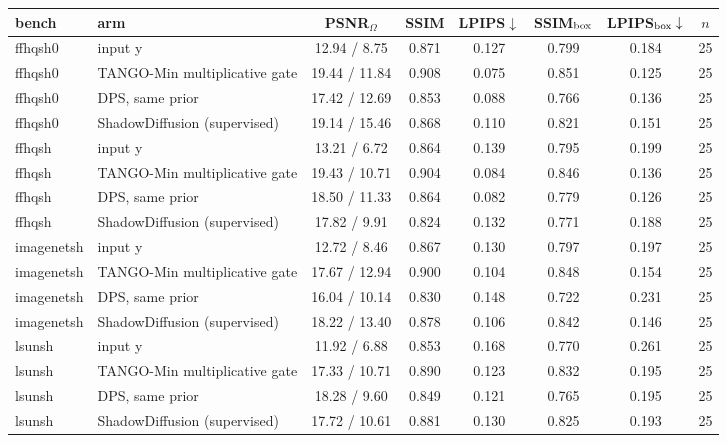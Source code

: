 \begin{tabular}{llcccccc}
\toprule
bench & arm & PSNR$_\Omega$ & SSIM & LPIPS$\downarrow$ & SSIM$_{\rm box}$ & LPIPS$_{\rm box}\downarrow$ & $n$\\
\midrule
ffhqsh0 & input y & 12.94 / 8.75 & 0.871 & 0.127 & 0.799 & 0.184 & 25\\
ffhqsh0 & TANGO-Min multiplicative gate & 19.44 / 11.84 & 0.908 & 0.075 & 0.851 & 0.125 & 25\\
ffhqsh0 & DPS, same prior & 17.42 / 12.69 & 0.853 & 0.088 & 0.766 & 0.136 & 25\\
ffhqsh0 & ShadowDiffusion (supervised) & 19.14 / 15.46 & 0.868 & 0.110 & 0.821 & 0.151 & 25\\
\midrule
ffhqsh & input y & 13.21 / 6.72 & 0.864 & 0.139 & 0.795 & 0.199 & 25\\
ffhqsh & TANGO-Min multiplicative gate & 19.43 / 10.71 & 0.904 & 0.084 & 0.846 & 0.136 & 25\\
ffhqsh & DPS, same prior & 18.50 / 11.33 & 0.864 & 0.082 & 0.779 & 0.126 & 25\\
ffhqsh & ShadowDiffusion (supervised) & 17.82 / 9.91 & 0.824 & 0.132 & 0.771 & 0.188 & 25\\
\midrule
imagenetsh & input y & 12.72 / 8.46 & 0.867 & 0.130 & 0.797 & 0.197 & 25\\
imagenetsh & TANGO-Min multiplicative gate & 17.67 / 12.94 & 0.900 & 0.104 & 0.848 & 0.154 & 25\\
imagenetsh & DPS, same prior & 16.04 / 10.14 & 0.830 & 0.148 & 0.722 & 0.231 & 25\\
imagenetsh & ShadowDiffusion (supervised) & 18.22 / 13.40 & 0.878 & 0.106 & 0.842 & 0.146 & 25\\
\midrule
lsunsh & input y & 11.92 / 6.88 & 0.853 & 0.168 & 0.770 & 0.261 & 25\\
lsunsh & TANGO-Min multiplicative gate & 17.33 / 10.71 & 0.890 & 0.123 & 0.832 & 0.195 & 25\\
lsunsh & DPS, same prior & 18.28 / 9.60 & 0.849 & 0.121 & 0.765 & 0.195 & 25\\
lsunsh & ShadowDiffusion (supervised) & 17.72 / 10.61 & 0.881 & 0.130 & 0.825 & 0.193 & 25\\
\bottomrule
\end{tabular}
